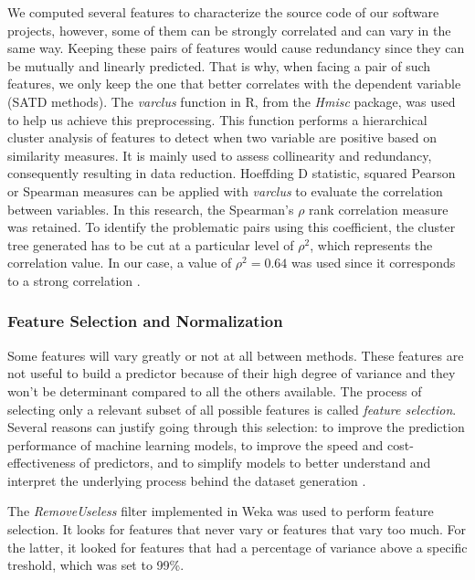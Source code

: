 We computed several features to characterize the source code of our software projects, however, some of them can be strongly correlated and can vary in the same way. Keeping these pairs of features would cause redundancy since they can be mutually and linearly predicted. That is why, when facing a pair of such features, we only keep the one that better correlates with the dependent variable (\ac{SATD} methods). The \emph{varclus} function in R, from the \emph{Hmisc} package, was used to help us achieve this preprocessing. This function performs a hierarchical cluster analysis of features to detect when two variable are positive based on similarity measures. It is mainly used to assess collinearity and redundancy, consequently resulting in data reduction. Hoeffding D statistic, squared Pearson or Spearman measures can be applied with \emph{varclus} to evaluate the correlation between variables. In this research, the Spearman's $\rho$ rank correlation measure was retained. To identify the problematic pairs using this coefficient, the cluster tree generated has to be cut at a particular level of $\rho^2$, which represents the correlation value. In our case, a value of $\rho^2=0.64$ was used since it corresponds to a strong correlation \citep{Cohen-1988}.

\subsubsection{Feature Selection and Normalization}

Some features will vary greatly or not at all between methods. These features are not useful to build a predictor because of their high degree of variance and they won't be determinant compared to all the others available. The process of selecting only a relevant subset of all possible features is called \emph{feature selection}. Several reasons can justify going through this selection: to improve the prediction performance of machine learning models, to improve the speed and cost-effectiveness of predictors, and to simplify models to better understand and interpret the underlying process behind the dataset generation \citep{guyon2003introduction}. \par 

The \emph{RemoveUseless} filter implemented in Weka \citep{hall2009weka} was used to perform feature selection. It looks for features that never vary or features that vary too much. For the latter, it looked for features that had a percentage of variance above a specific treshold, which was set to 99\%. \par 

